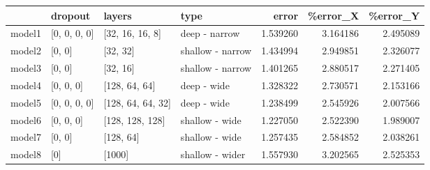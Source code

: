 \begin{tabular}{llllrrr}
\toprule
{} &       dropout &             layers &              type &     error &  \%error\_X &  \%error\_Y \\
\midrule
model1 &  [0, 0, 0, 0] &    [32, 16, 16, 8] &     deep - narrow &  1.539260 &  3.164186 &  2.495089 \\
model2 &        [0, 0] &           [32, 32] &  shallow - narrow &  1.434994 &  2.949851 &  2.326077 \\
model3 &        [0, 0] &           [32, 16] &  shallow - narrow &  1.401265 &  2.880517 &  2.271405 \\
model4 &     [0, 0, 0] &      [128, 64, 64] &       deep - wide &  1.328322 &  2.730571 &  2.153166 \\
model5 &  [0, 0, 0, 0] &  [128, 64, 64, 32] &       deep - wide &  1.238499 &  2.545926 &  2.007566 \\
model6 &     [0, 0, 0] &    [128, 128, 128] &    shallow - wide &  1.227050 &  2.522390 &  1.989007 \\
model7 &        [0, 0] &          [128, 64] &    shallow - wide &  1.257435 &  2.584852 &  2.038261 \\
model8 &           [0] &             [1000] &   shallow - wider &  1.557930 &  3.202565 &  2.525353 \\
\bottomrule
\end{tabular}
